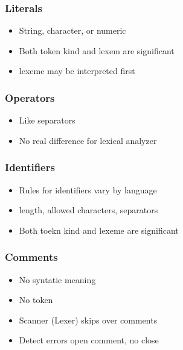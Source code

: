 \documentclass[usepdftitle=false,professionalfonts,compress ]{beamer}
\begin{document}
{
\begin{frame}\frametitle{Literals}

	\begin{itemize}
	\item String, character, or numeric
			\item Both token kind and lexem are significant
			\item lexeme may be interpreted first
				\end{itemize}

\end{frame}}





{
\begin{frame}\frametitle{Operators}

	\begin{itemize}
	\item Like separators
			\item No real difference for lexical analyzer
				\end{itemize}

\end{frame}}




{
\begin{frame}\frametitle{Identifiers}

	\begin{itemize}
	\item Rules for identifiers vary by language
			\item length, allowed characters, separators
			\item Both toekn kind and lexeme are significant
				\end{itemize}

\end{frame}}





{
\begin{frame}\frametitle{Comments}

	\begin{itemize}
	\item No syntatic meaning
			\item No token
			\item Scanner (Lexer) skips over comments
			\item Detect errors open comment, no close
				\end{itemize}

\end{frame}}
\end{document}
